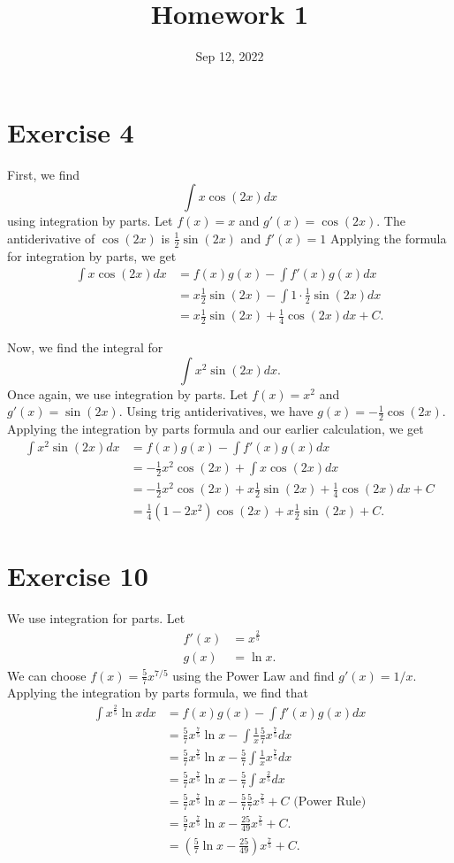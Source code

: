 \documentclass[11pt,letterpaper]{article}
\date{Sep 12, 2022}
\title{Homework 1}
\renewcommand\ex[1]{\section*{Exercise #1}}
\begin{document}
\maketitle
\setcounter{exercise_section}{1}

\pagebreak

\ex{4}
First, we find
\[
  \int x\cos(2x) dx
\]
using integration by parts. Let $f(x) = x$ and $g'(x) = \cos(2x)$.
The antiderivative of $\cos(2x)$ is $\frac12\sin(2x)$ and $f'(x) = 1$
Applying the formula for integration by parts, we get
\begin{align*}
  \int x\cos(2x) dx
  &= f(x)g(x) - \int f'(x)g(x) dx \\
  &= x \frac12 \sin(2x) - \int 1 \cdot \frac12 \sin(2x) dx \\
  &= x \frac12 \sin(2x) + \frac14 \cos(2x) dx + C.
\end{align*}

Now, we find the integral for
\[
  \int x^2 \sin(2x)dx.
\]
Once again, we use integration by parts.
Let $f(x) = x^2$ and $g'(x) = \sin(2x)$.
Using trig antiderivatives, we have $g(x) = -\frac12 \cos(2x)$.
Applying the integration by parts formula and our earlier calculation, we get
\begin{align*}
  \int x^2 \sin(2x)dx
  &= f(x)g(x) - \int f'(x)g(x) dx \\
  &= -\frac12x^2\cos(2x) + \int x \cos(2x) dx \\
  &= -\frac12x^2\cos(2x) + x \frac12 \sin(2x) + \frac14 \cos(2x) dx + C \\
  &= \frac14(1 - 2x^2) \cos(2x) + x \frac12 \sin(2x) + C.
\end{align*}

\ex{10}

We use integration for parts. Let
\begin{align*}
  f'(x) &= x^{\frac25} \\
  g(x) &= \ln x.
\end{align*}
We can choose $f(x) = \frac57 x^{7/5}$ using the Power Law and find $g'(x) = 1/x$.
Applying the integration by parts formula, we find that
\begin{align*}
  \int x^{\frac25} \ln x dx
  &= f(x)g(x) - \int f'(x)g(x) dx \\
  &= \frac57 x^{\frac75} \ln x - \int \frac1x \frac57 x^{\frac75} dx \\
  &= \frac57 x^{\frac75} \ln x - \frac57 \int \frac1x x^{\frac75} dx \\
  &= \frac57 x^{\frac75} \ln x - \frac57 \int x^{\frac25} dx \\
  &= \frac57 x^{\frac75} \ln x - \frac57 \frac57 x^{\frac75} + C \text{   (Power Rule)} \\
  &= \frac57 x^{\frac75} \ln x - \frac{ 25 }{ 49 } x^{\frac75} + C. \\
  &= \left(\frac57 \ln x - \frac{ 25 }{ 49 }\right) x^{\frac75} + C.
\end{align*}
\end{document}
